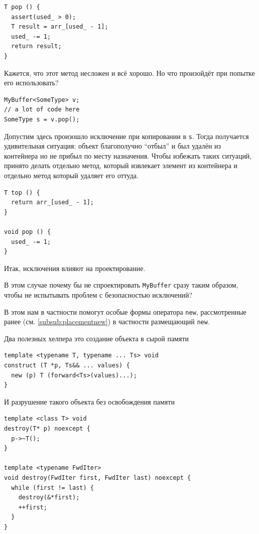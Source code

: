 \documentclass[a4paper,12pt,oneside]{book}
\begin{document}
\begin{lstlisting}
T pop () {
  assert(used_ > 0);
  T result = arr_[used_ - 1];
  used_ -= 1;
  return result;
}
\end{lstlisting}

Кажется, что этот метод несложен и всё хорошо. Но что произойдёт при попытке его использовать?

\begin{lstlisting}
MyBuffer<SomeType> v;
// a lot of code here
SomeType s = v.pop();
\end{lstlisting}

Допустим здесь произошло исключение при копировании в \lstinline!s!. Тогда получается удивительная ситуация: объект благополучно ``отбыл'' и был удалён из контейнера но не прибыл по месту назначения. Чтобы избежать таких ситуаций, принято делать отдельно метод, который извлекает элемент из контейнера и отдельно метод который удаляет его оттуда.

\begin{lstlisting}
T top () {
  return arr_[used_ - 1];
}

void pop () {
  used_ -= 1;
}
\end{lstlisting}

Итак, исключения влияют на проектирование.

В этом случае почему бы не спроектировать \lstinline!MyBuffer! сразу таким образом, чтобы не испытывать проблем с безопасностью исключений?

В этом нам в частности помогут особые формы оператора \lstinline!new!, рассмотренные ранее (см. \ref{subsub:placementnew}) в частности размещающий \lstinline!new!.

Два полезных хелпера это создание объекта в сырой памяти

\begin{lstlisting}
template <typename T, typename ... Ts> void
construct (T *p, Ts&& ... values) {
  new (p) T (forward<Ts>(values)...);
}
\end{lstlisting}

И разрушение такого объекта без освобождения памяти

\begin{lstlisting}
template <class T> void
destroy(T* p) noexcept {
  p->~T();
}

template <typename FwdIter>
void destroy(FwdIter first, FwdIter last) noexcept {
  while (first != last) {
    destroy(&*first);
    ++first;
  }
}
\end{lstlisting}
\end{document}
